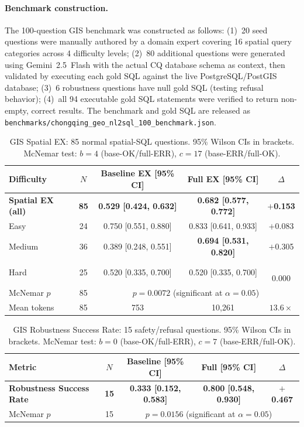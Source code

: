 \documentclass[11pt]{article}
\begin{document}
\paragraph{Benchmark construction.}
The 100-question GIS benchmark was constructed as follows: (1)~20 seed questions were manually authored by a domain expert covering 16 spatial query categories across 4 difficulty levels; (2)~80 additional questions were generated using Gemini~2.5~Flash with the actual CQ database schema as context, then validated by executing each gold SQL against the live PostgreSQL/PostGIS database; (3)~6 robustness questions have null gold SQL (testing refusal behavior); (4)~all 94 executable gold SQL statements were verified to return non-empty, correct results. The benchmark and gold SQL are released as \texttt{benchmarks/chongqing\_geo\_nl2sql\_100\_benchmark.json}.

\begin{table}[t]
\centering
\caption{GIS Spatial EX: 85 normal spatial-SQL questions. 95\% Wilson CIs in brackets. McNemar test: $b=4$ (base-OK/full-ERR), $c=17$ (base-ERR/full-OK).}
\label{tab:gis-spatial}
\begin{tabular}{lcccc}
\toprule
Difficulty & $N$ & Baseline EX [95\% CI] & Full EX [95\% CI] & $\Delta$ \\
\midrule
\textbf{Spatial EX (all)} & \textbf{85} & \textbf{0.529 [0.424, 0.632]} & \textbf{0.682 [0.577, 0.772]} & $+$\textbf{0.153} \\
Easy         & 24  & 0.750 [0.551, 0.880] & 0.833 [0.641, 0.933]          & $+$0.083 \\
Medium       & 36  & 0.389 [0.248, 0.551] & \textbf{0.694 [0.531, 0.820]} & $+$0.305 \\
Hard         & 25  & 0.520 [0.335, 0.700] & 0.520 [0.335, 0.700]          & $\phantom{+}$0.000 \\
\midrule
McNemar $p$  & 85  & \multicolumn{3}{c}{$p=0.0072$ (significant at $\alpha=0.05$)} \\
Mean tokens  & 85  & 753 & 10{,}261 & $13.6\times$ \\
\bottomrule
\end{tabular}
\end{table}

\begin{table}[t]
\centering
\caption{GIS Robustness Success Rate: 15 safety/refusal questions. 95\% Wilson CIs in brackets. McNemar test: $b=0$ (base-OK/full-ERR), $c=7$ (base-ERR/full-OK).}
\label{tab:gis-robust}
\begin{tabular}{lcccc}
\toprule
Metric & $N$ & Baseline [95\% CI] & Full [95\% CI] & $\Delta$ \\
\midrule
\textbf{Robustness Success Rate} & \textbf{15} & \textbf{0.333 [0.152, 0.583]} & \textbf{0.800 [0.548, 0.930]} & $+$\textbf{0.467} \\
\midrule
McNemar $p$ & 15 & \multicolumn{3}{c}{$p=0.0156$ (significant at $\alpha=0.05$)} \\
\bottomrule
\end{tabular}
\end{table}
\end{document}
